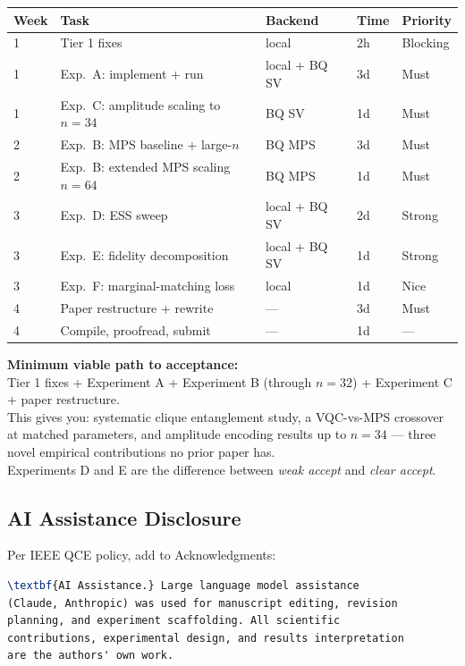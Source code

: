 \documentclass[11pt]{article}
\begin{document}
\begin{table}[h]
\centering
\begin{tabular}{lllll}
\toprule
\textbf{Week} & \textbf{Task} & \textbf{Backend} &
\textbf{Time} & \textbf{Priority} \\
\midrule
1 & Tier 1 fixes                        & local  & 2h    & Blocking \\
1 & Exp.~A: implement + run             & local + BQ SV & 3d  & Must \\
1 & Exp.~C: amplitude scaling to $n=34$ & BQ SV         & 1d  & Must \\
2 & Exp.~B: MPS baseline + large-$n$    & BQ MPS        & 3d  & Must \\
2 & Exp.~B: extended MPS scaling $n=64$ & BQ MPS        & 1d  & Must \\
3 & Exp.~D: ESS sweep                   & local + BQ SV & 2d  & Strong \\
3 & Exp.~E: fidelity decomposition      & local + BQ SV & 1d  & Strong \\
3 & Exp.~F: marginal-matching loss      & local         & 1d  & Nice \\
4 & Paper restructure + rewrite         & ---           & 3d  & Must \\
4 & Compile, proofread, submit          & ---           & 1d  & --- \\
\bottomrule
\end{tabular}
\end{table}

\begin{notebox}
\textbf{Minimum viable path to acceptance:}\\
Tier 1 fixes + Experiment A + Experiment B (through $n=32$) +
Experiment C + paper restructure.\\[4pt]
This gives you: systematic clique entanglement study, a
VQC-vs-MPS crossover at matched parameters, and amplitude
encoding results up to $n=34$ --- three novel empirical
contributions no prior paper has.\\[4pt]
Experiments D and E are the difference between
\textit{weak accept} and \textit{clear accept}.
\end{notebox}

\subsection{AI Assistance Disclosure}

Per IEEE QCE policy, add to Acknowledgments:

\begin{lstlisting}[language=TeX]
\textbf{AI Assistance.} Large language model assistance
(Claude, Anthropic) was used for manuscript editing, revision
planning, and experiment scaffolding. All scientific
contributions, experimental design, and results interpretation
are the authors' own work.
\end{lstlisting}
\end{document}
